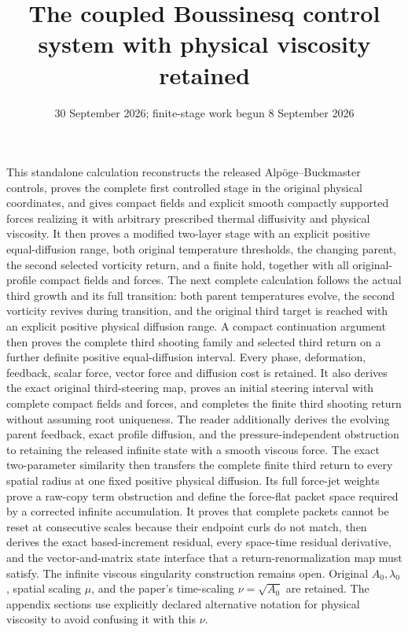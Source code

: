 \documentclass[11pt]{article}
\title{The coupled Boussinesq control system with physical viscosity retained}
\author{}
\date{30 September 2026; finite-stage work begun 8 September 2026}
\begin{document}
\maketitle
\noindent This standalone calculation reconstructs the released
Alp\"oge--Buckmaster controls, proves the complete first controlled stage
in the original physical coordinates, and gives compact fields and
explicit smooth compactly supported forces realizing it with arbitrary
prescribed thermal diffusivity and physical viscosity. It then proves
a modified two-layer stage with an explicit positive equal-diffusion
range, both original temperature thresholds, the changing parent,
the second selected vorticity return, and a finite hold, together
with all original-profile compact fields and forces. The next complete
calculation follows the actual third growth and its full transition:
both parent temperatures evolve, the second vorticity revives during
transition, and the original third target is reached with an explicit
positive physical diffusion range. A compact continuation argument then
proves the complete third shooting family and selected third return on a
further definite positive equal-diffusion interval. Every phase, deformation, feedback,
scalar force, vector force and diffusion cost is retained. It also derives
the exact original third-steering map, proves an initial steering
interval with complete compact fields and forces, and completes the finite
third shooting return without assuming root uniqueness. The reader additionally derives
the evolving parent feedback, exact profile diffusion, and the
pressure-independent obstruction to retaining the released infinite
state with a smooth viscous force.  The exact two-parameter similarity
then transfers the complete finite third return to every spatial radius
at one fixed positive physical diffusion.  Its full force-jet weights
prove a raw-copy term obstruction and define the force-flat packet space
required by a corrected infinite accumulation.  It proves that complete
packets cannot be reset at consecutive scales because their endpoint curls
do not match, then derives the exact based-increment residual, every
space-time residual derivative, and the vector-and-matrix state interface
that a return-renormalization map must satisfy.  The infinite viscous
singularity construction remains open. Original $A_0,\lambda_0$, spatial scaling
$\mu$, and the paper's time-scaling $\nu=\sqrt{A_0}$ are retained.
The appendix sections use explicitly declared alternative notation for
physical viscosity to avoid confusing it with this $\nu$.
\end{document}
